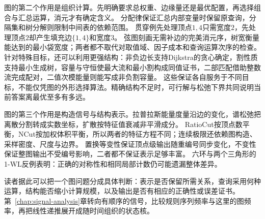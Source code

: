 图的第二个作用是组织计算。先明确要求总权重、边缘量还是最优配置，再选择组合与汇总运算，消元才有确定含义。
分配律保证汇总内部变量时保留原查询，分隔集和树分解则限制中间表的依赖范围。
贯穿例先处理顶点\(1,4\)只需宽度\(2\)，先处理顶点\(2\)却产生填充边\(\{1,4\}\)和宽度\(3\)。
弦图刻画无需补边的完美消元序，树宽衡量能达到的最小袋宽度；两者都不取代对取值域、因子成本和查询运算次序的检查。
针对特殊目标，还可以利用更强结构：非负边长支持Dijkstra的贪心确定，割性质支持最小生成树，容量与守恒使最大流和最小割构成同值证书，二部匹配借助整数流完成配对，二值次模能量则能写成非负割容量。
这些保证各自服务于不同目标，不能仅凭图的外形选择算法。精确结构不足时，可行解与松弛下界共同说明当前答案离最优至多有多远。

图的第三个作用是构造信号与结构表示。拉普拉斯能量度量沿边的变化，谱松弛把离散分割转成实数坐标，扩散按特征值衰减非平滑成分。
RatioCut按顶点数平衡，NCut按加权体积平衡，所以两者的特征方程不同；连续极限还依赖图构造、采样密度、尺度与边界。
置换等变性保证顶点级输出随重编号同步变化，不变性保证整图输出不受编号影响，二者都不保证表示足够丰富。
六环与两个三角形的1-WL反例表明：正确的对称性和相同局部计数仍可能遗漏整体差异。

读者据此可以把一个图问题分成具体判断：表示是否保留所需关系，查询采用何种运算，结构能否缩小计算规模，以及输出是否有相应的正确性或误差证书。
第~\ref{chap:signal-analysis}章转向有顺序的信号，比较规则序列频率与这里的图频率，再把线性递推展开成随时间组织的状态核。
